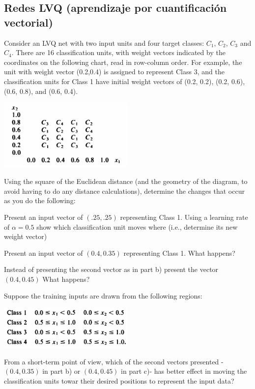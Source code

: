 \subsection{Redes LVQ (aprendizaje por cuantificación vectorial)}
\begin{problem}[5]
Consider an LVQ net with two input units and four target classes: $C_1$, $C_2$, $C_3$ and $C_4$. There are 16 classification units, with weight vectors indicated by the coordinates on the following chart, read in row-column order. For example, the unit with weight vector (0.2,0.4) is assigned to represent Class 3, and the classification units for Class 1 have initial weight vectors of (0.2, 0.2), (0.2, 0.6), (0.6, 0.8), and (0.6, 0.4).
\begin{center}
\includegraphics[width=0.5\textwidth]{img/figure4-5.png}
\end{center}
Using the square of the Euclidean distance (and the geometry of the diagram, to avoid having to do any distance calculations), determine the changes that occur as you do the following:

\ppart Present an input vector of $(.25, .25)$ representing Class 1. Using a learning rate of $α=0.5$ show which classification unit moves where (i.e., determine its new weight vector)

\ppart Present an input vector of $(0.4,0.35)$ representing Class 1. What happens?

\ppart Instead of presenting the second vector as in part b) present the vector $(0.4,0.45)$ What happens?

\ppart Suppose the training inputs are drawn from the following regions:
\begin{center}
\includegraphics[width=0.5\textwidth]{img/figure4-5-d.png}
\end{center}

From a short-term point of view, which of the second vectors presented -$(0.4,0.35)$ in part b) or $(0.4,0.45)$ in part c)- has better effect in moving the classification units towar their desired positions to represent the input data?
\solution
{}


\end{problem}
